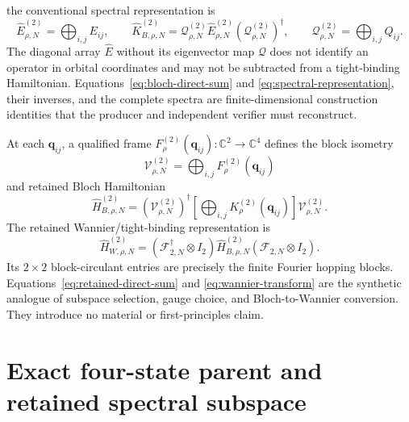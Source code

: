 \documentclass[11pt]{article}
\begin{document}
the conventional spectral representation is
\begin{equation}
 \widehat E_{\rho,N}^{(2)}=\bigoplus_{i,j}E_{ij},
 \qquad
 \widehat K_{B,\rho,N}^{(2)}
 =\mathcal Q_{\rho,N}^{(2)}\widehat E_{\rho,N}^{(2)}
  (\mathcal Q_{\rho,N}^{(2)})^\dagger,
 \qquad \mathcal Q_{\rho,N}^{(2)}=\bigoplus_{i,j}Q_{ij}.
 \label{eq:spectral-representation}
\end{equation}
The diagonal array $\widehat E$ without its eigenvector map $\mathcal Q$ does not identify
an operator in orbital coordinates and may not be subtracted from a tight-binding
Hamiltonian. Equations~\eqref{eq:bloch-direct-sum} and
\eqref{eq:spectral-representation}, their inverses, and the complete spectra are
finite-dimensional construction identities that the producer and independent verifier
must reconstruct.

At each $\mathbf q_{ij}$, a qualified frame
$F_\rho^{(2)}(\mathbf q_{ij}):\mathbb C^2\to\mathbb C^4$ defines the block isometry
\begin{equation}
 \mathcal V_{\rho,N}^{(2)}=\bigoplus_{i,j}F_\rho^{(2)}(\mathbf q_{ij})
\end{equation}
and retained Bloch Hamiltonian
\begin{equation}
 \widehat H_{B,\rho,N}^{(2)}
 =(\mathcal V_{\rho,N}^{(2)})^\dagger
 \left[\bigoplus_{i,j}K_\rho^{(2)}(\mathbf q_{ij})\right]
 \mathcal V_{\rho,N}^{(2)}.
 \label{eq:retained-direct-sum}
\end{equation}
The retained Wannier/tight-binding representation is
\begin{equation}
 \widehat H_{W,\rho,N}^{(2)}
 =(\mathcal F_{2,N}^\dagger\otimes I_2)
 \widehat H_{B,\rho,N}^{(2)}
 (\mathcal F_{2,N}\otimes I_2).
 \label{eq:wannier-transform}
\end{equation}
Its $2\times2$ block-circulant entries are precisely the finite Fourier hopping blocks.
Equations~\eqref{eq:retained-direct-sum} and \eqref{eq:wannier-transform} are the
synthetic analogue of subspace selection, gauge choice, and Bloch-to-Wannier conversion.
They introduce no material or first-principles claim.

\section{Exact four-state parent and retained spectral subspace}
\end{document}
